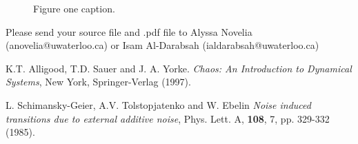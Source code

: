 \documentclass[12pt]{article}
\begin{document}







\begin{figure}[H]
\centering
{}
\caption{Figure one caption.}
\label{fig1}
\end{figure}
 
 
 
 Please send your source file  and .pdf file to Alyssa Novelia (anovelia@uwaterloo.ca) or Isam Al-Darabsah (ialdarabsah@uwaterloo.ca)


 

\begin{thebibliography}{00}
\setlength{\itemsep}{-1mm}
\small
{} K.T. Alligood, T.D. Sauer and J. A. Yorke. \textit{Chaos: An Introduction to Dynamical Systems}, New York, Springer-Verlag (1997).

 L. Schimansky-Geier, A.V. Tolstopjatenko and W. Ebelin \textit{Noise induced transitions due to external additive noise}, Phys. Lett. A, \textbf{108}, 7, pp. 329-332 (1985).
\end{thebibliography}
\normalsize
\end{document}
